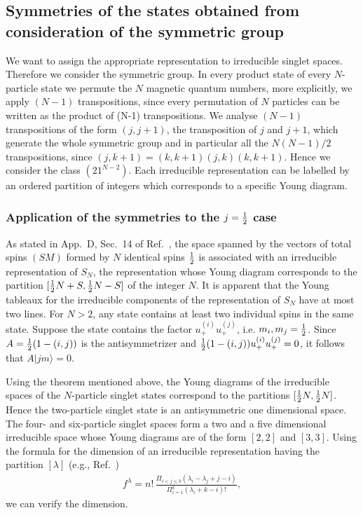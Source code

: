 \documentclass[pra,amsfonts,showpacs,preprint,showkeys]{revtex4}
\begin{document}
\subsection{Symmetries of the states obtained from consideration of
the symmetric group}We want to assign the appropriate
representation to irreducible singlet spaces. Therefore we
consider the symmetric group. In every product state of every
$N$-particle state we permute the $N$ magnetic quantum numbers,
more explicitly, we apply $(N-1)$ transpositions, since every
permutation of $N$ particles can be written as the product of
(N-1) transpositions. We analyse $(N-1)$ transpositions of the
form $(j,j+1)$, the transposition of $j$ and $j+1$, which generate
the whole symmetric group and in particular all the $N(N-1)/2$ transpositions,
since $(j,k+1)=(k,k+1)(j,k)(k,k+1).$
Hence we consider the class $(21^{N-2})$. Each irreducible
representation can be labelled by an ordered partition of integers
which corresponds to a specific Young diagram.



\subsubsection{Application of the symmetries to the $j={1\over 2}$ case}
As stated in App.~D, Sec.~14 of Ref.~\cite{messiah-62}, the
space spanned by the vectors of total spins $(SM)$ formed by $N$
identical spins ${1\over 2}$ is associated with an irreducible
representation of $S_N$, the representation whose Young diagram
corresponds to the partition $[{1\over 2}N+S,{1\over 2}N-S]$ of
the integer $N$.  It is apparent that the Young tableaux for the
irreducible components of the representation of $S_N$ have at most
two lines. For $N>2$, any state contains at least two individual
spins in the same state.
Suppose the state contains the factor
$u_+^{(i)}u_+^{(j)}$, i.e. $m_i, m_j ={1\over 2}$.
Since
$A={1\over 2}(1-(i,j))$ is the antisymmetrizer and
${1\over 2}(1-(i,j))u_+^{(i)}u_+^{(j)}=0$,
it follows that $A|jm\rangle=0$.

Using the theorem mentioned above, the Young diagrams of the
irreducible spaces of the $N$-particle singlet states correspond to
the partitions $[{1\over 2}N,{1\over 2}N]$. Hence the two-particle
singlet state is an antisymmetric one dimensional space. The four-
and six-particle singlet spaces form a two and a five dimensional
irreducible space whose Young diagrams are of the form $[2,2]$ and
$[3,3]$.
Using the formula for the dimension of an irreducible
representation having the partition $[\lambda]$ (e.g., Ref.~\cite{wybourne})
\begin{align}
f^\lambda = n!
\,
\frac{\Pi_{i<j\leq
k}(\lambda_i-\lambda_j+j-i)}{\Pi^k_{i=1}(\lambda_i+k-i)!},\label{dim}\end{align}
 we can verify the dimension.
\end{document}
